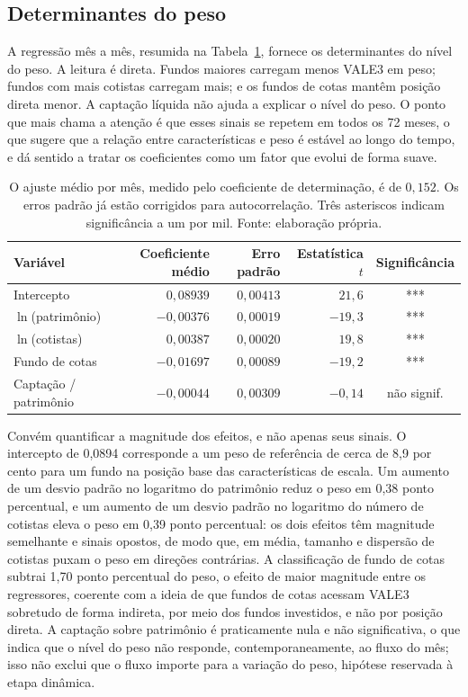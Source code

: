 \documentclass[12pt,a4paper]{article}
\begin{document}
\subsection{Determinantes do peso}
\label{sec:det}

A regressão mês a mês, resumida na Tabela~\ref{tab:fmtab}, fornece os determinantes do nível do
peso. A leitura é direta. Fundos maiores carregam menos VALE3 em peso; fundos com mais cotistas
carregam mais; e os fundos de cotas mantêm posição direta menor. A captação líquida não ajuda a
explicar o nível do peso. O ponto que mais chama a atenção é que esses sinais se repetem em todos
os 72 meses, o que sugere que a relação entre características e peso é estável ao longo do tempo, e
dá sentido a tratar os coeficientes como um fator que evolui de forma suave.

\begin{table}[h]\centering\small
\caption{Regressão do peso mês a mês, resumo no estilo Fama--MacBeth (72 meses).}
\label{tab:fmtab}
\begin{tabular}{@{}lrrrc@{}}
\toprule
Variável & Coeficiente médio & Erro padrão & Estatística $t$ & Significância \\
\midrule
Intercepto              & $0{,}08939$  & $0{,}00413$ & $21{,}6$  & *** \\
$\ln$(patrimônio)       & $-0{,}00376$ & $0{,}00019$ & $-19{,}3$ & *** \\
$\ln$(cotistas)         & $0{,}00387$  & $0{,}00020$ & $19{,}8$  & *** \\
Fundo de cotas          & $-0{,}01697$ & $0{,}00089$ & $-19{,}2$ & *** \\
Captação / patrimônio   & $-0{,}00044$ & $0{,}00309$ & $-0{,}14$ & não signif. \\
\bottomrule
\end{tabular}
\caption*{\footnotesize O ajuste médio por mês, medido pelo coeficiente de determinação, é de
$0{,}152$. Os erros padrão já estão corrigidos para autocorrelação. Três asteriscos indicam
significância a um por mil. Fonte: elaboração própria.}
\end{table}

Convém quantificar a magnitude dos efeitos, e não apenas seus sinais. O intercepto de 0,0894
corresponde a um peso de referência de cerca de 8,9 por cento para um fundo na posição base das
características de escala. Um aumento de um desvio padrão no logaritmo do patrimônio reduz o peso
em 0,38 ponto percentual, e um aumento de um desvio padrão no logaritmo do número de cotistas
eleva o peso em 0,39 ponto percentual: os dois efeitos têm magnitude semelhante e sinais opostos,
de modo que, em média, tamanho e dispersão de cotistas puxam o peso em direções contrárias. A
classificação de fundo de cotas subtrai 1,70 ponto percentual do peso, o efeito de maior
magnitude entre os regressores, coerente com a ideia de que fundos de cotas acessam VALE3
sobretudo de forma indireta, por meio dos fundos investidos, e não por posição direta. A captação
sobre patrimônio é praticamente nula e não significativa, o que indica que o nível do peso não
responde, contemporaneamente, ao fluxo do mês; isso não exclui que o fluxo importe para a
variação do peso, hipótese reservada à etapa dinâmica.
\end{document}
